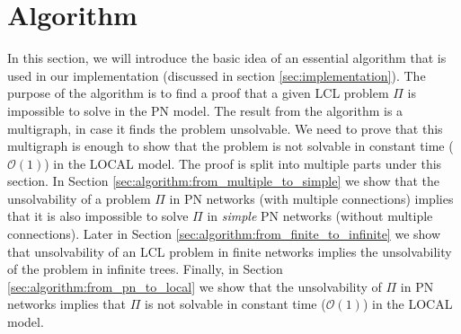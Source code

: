 
\section{Algorithm} \label{sec:algorithm}


%
%
%




In this section, we will introduce the basic idea of an essential algorithm that is used in our implementation (discussed in section \ref{sec:implementation}).
The purpose of the algorithm is to find a proof that a given LCL problem $\Pi$ is impossible to solve in the PN model.
The result from the algorithm is a multigraph, in case it finds the problem unsolvable.
We need to prove that this multigraph is enough to show that the problem is not solvable in constant time ($\mathcal{O}(1)$) in the LOCAL model.
The proof is split into multiple parts under this section.
In Section \ref{sec:algorithm:from_multiple_to_simple} we show that the unsolvability of a problem $\Pi$ in PN networks (with multiple connections) implies that it is also impossible to solve $\Pi$ in \emph{simple} PN networks (without multiple connections).
Later in Section \ref{sec:algorithm:from_finite_to_infinite} we show that unsolvability of an LCL problem in finite networks implies the unsolvability of the problem in infinite trees.
Finally, in Section \ref{sec:algorithm:from_pn_to_local} we show that the unsolvability of $\Pi$ in PN networks implies that $\Pi$ is not solvable in constant time ($\mathcal{O}(1)$) in the LOCAL model.


